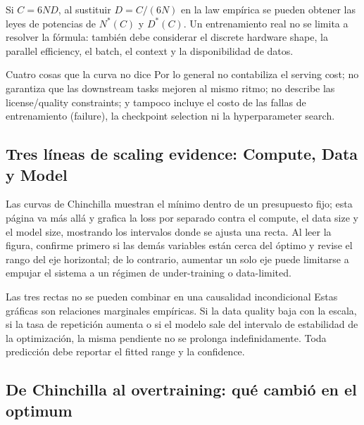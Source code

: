 
Si $C=6ND$, al sustituir $D=C/(6N)$ en la law empírica se pueden obtener las leyes de potencias de $N^*(C)$ y $D^*(C)$. Un entrenamiento real no se limita a resolver la fórmula: también debe considerar el discrete hardware shape, la parallel efficiency, el batch, el context y la disponibilidad de datos.

\begin{knowledgebox}{Cuatro cosas que la curva no dice}
Por lo general no contabiliza el serving cost; no garantiza que las downstream tasks mejoren al mismo ritmo; no describe las license/quality constraints; y tampoco incluye el costo de las fallas de entrenamiento (failure), la checkpoint selection ni la hyperparameter search.
\end{knowledgebox}

\subsection{Tres líneas de scaling evidence: Compute, Data y Model}

Las curvas de Chinchilla muestran el mínimo dentro de un presupuesto fijo; esta página va más allá y grafica la loss por separado contra el compute, el data size y el model size, mostrando los intervalos donde se ajusta una recta. Al leer la figura, confirme primero si las demás variables están cerca del óptimo y revise el rango del eje horizontal; de lo contrario, aumentar un solo eje puede limitarse a empujar el sistema a un régimen de under-training o data-limited.


\begin{warningbox}{Las tres rectas no se pueden combinar en una causalidad incondicional}
Estas gráficas son relaciones marginales empíricas. Si la data quality baja con la escala, si la tasa de repetición aumenta o si el modelo sale del intervalo de estabilidad de la optimización, la misma pendiente no se prolonga indefinidamente. Toda predicción debe reportar el fitted range y la confidence.
\end{warningbox}

\subsection{De Chinchilla al overtraining: qué cambió en el optimum}

